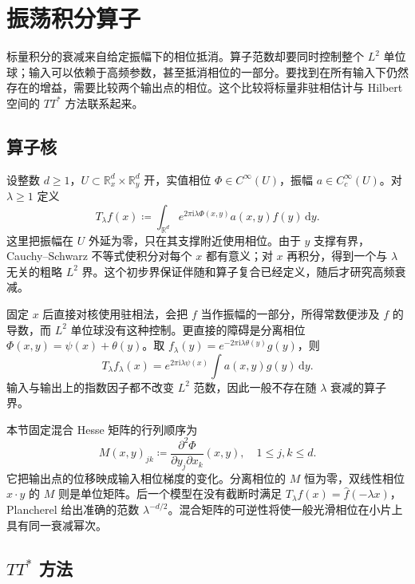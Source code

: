 \section{振荡积分算子}
\label{b2:sec:2104}

标量积分的衰减来自给定振幅下的相位抵消。算子范数却要同时控制整个 \(L^2\) 单位球；输入可以依赖于高频参数，甚至抵消相位的一部分。要找到在所有输入下仍然存在的增益，需要比较两个输出点的相位。这个比较将标量非驻相估计与 Hilbert 空间的 \(TT^*\) 方法联系起来。

\subsection{算子核}
\label{b2:subsec:210401}

设整数 \(d\ge1\)，\(U\subset\mathbb R^d_x\times\mathbb R^d_y\) 开，实值相位 \(\Phi\in C^\infty(U)\)，振幅 \(a\in C_c^\infty(U)\)。对 \(\lambda\ge1\) 定义
\[
 T_\lambda f(x)\coloneqq
 \int_{\mathbb R^d}e^{2\pi\mathrm i\lambda\Phi(x,y)}a(x,y)f(y)\,\mathrm dy.
\]
这里把振幅在 \(U\) 外延为零，只在其支撑附近使用相位。由于 \(y\) 支撑有界，Cauchy--Schwarz 不等式使积分对每个 \(x\) 都有意义；对 \(x\) 再积分，得到一个与 \(\lambda\) 无关的粗略 \(L^2\) 界。这个初步界保证伴随和算子复合已经定义，随后才研究高频衰减。

\ProseParagraphBreak
固定 \(x\) 后直接对核使用驻相法，会把 \(f\) 当作振幅的一部分，所得常数便涉及 \(f\) 的导数，而 \(L^2\) 单位球没有这种控制。更直接的障碍是分离相位
\(\Phi(x,y)=\psi(x)+\theta(y)\)。取
\(f_\lambda(y)=e^{-2\pi\mathrm i\lambda\theta(y)}g(y)\)，则
\[
 T_\lambda f_\lambda(x)
 =e^{2\pi\mathrm i\lambda\psi(x)}\int a(x,y)g(y)\,\mathrm dy.
\]
输入与输出上的指数因子都不改变 \(L^2\) 范数，因此一般不存在随 \(\lambda\) 衰减的算子界。

\ProseParagraphBreak
本节固定混合 Hesse 矩阵的行列顺序为
\[
 M(x,y)_{jk}\coloneqq
 \frac{\partial^2\Phi}{\partial y_j\partial x_k}(x,y),
 \quad 1\le j,k\le d.
\]
它把输出点的位移映成输入相位梯度的变化。分离相位的 \(M\) 恒为零，双线性相位 \(x\cdot y\) 的 \(M\) 则是单位矩阵。后一个模型在没有截断时满足
\(T_\lambda f(x)=\widehat f(-\lambda x)\)，Plancherel 给出准确的范数 \(\lambda^{-d/2}\)。混合矩阵的可逆性将使一般光滑相位在小片上具有同一衰减幂次。

\subsection{\texorpdfstring{\(TT^*\)}{TT*} 方法}
\label{b2:subsec:210402}

